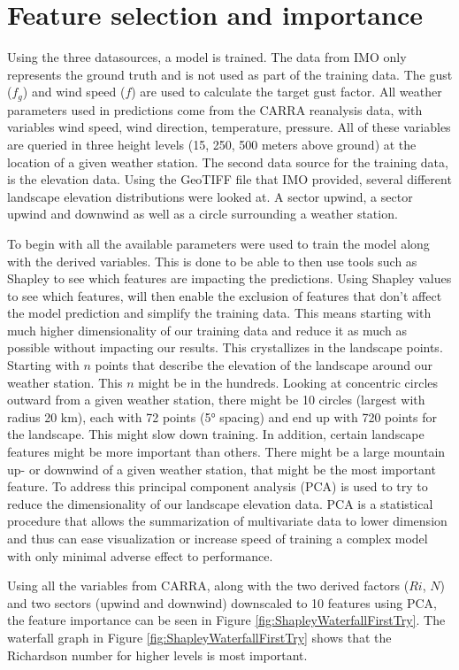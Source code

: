 \section{Feature selection and importance}
Using the three datasources, a model is trained. The data from IMO only represents the ground truth and is not used as part of the training data. The gust ($f_g$) and wind speed ($f$) are used to calculate the target gust factor. All weather parameters used in predictions come from the CARRA reanalysis data, with variables wind speed, wind direction, temperature, pressure. All of these variables are queried in three height levels (15, 250, 500 meters above ground) at the location of a given weather station. The second data source for the training data, is the elevation data. Using the GeoTIFF file that IMO provided, several different landscape elevation distributions were looked at. A sector upwind, a sector upwind and downwind as well as a circle surrounding a weather station.

To begin with all the available parameters were used to train the model along with the derived variables. This is done to be able to then use tools such as Shapley to see which features are impacting the predictions. Using Shapley values to see which features, will then enable the exclusion of features that don't affect the model prediction and simplify the training data. This means starting with much higher dimensionality of our training data and reduce it as much as possible without impacting our results. This crystallizes in the landscape points. Starting with $n$ points that describe the elevation of the landscape around our weather station. This $n$ might be in the hundreds. Looking at concentric circles outward from a given weather station, there might be 10 circles (largest with radius 20 km), each with 72 points (5° spacing) and end up with 720 points for the landscape. This might slow down training. In addition, certain landscape features might be more important than others. There might be a large mountain up- or downwind of a given weather station, that might be the most important feature. To address this principal component analysis (PCA) is used to try to reduce the dimensionality of our landscape elevation data. PCA is a statistical procedure that allows the summarization of multivariate data to lower dimension and thus can ease visualization or increase speed of training a complex model with only minimal adverse effect to performance\cite{pca_information}.

Using all the variables from CARRA, along with the two derived factors ($Ri$, $N$) and two sectors (upwind and downwind) downscaled to 10 features using PCA, the feature importance can be seen in Figure \ref{fig:ShapleyWaterfallFirstTry}. The waterfall graph in Figure \ref{fig:ShapleyWaterfallFirstTry} shows that the Richardson number for higher levels is most important.

